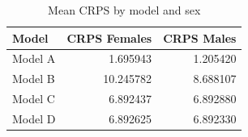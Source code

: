 \begin{table}[ht]
\centering
\begin{tabular}{lrr}
\hline
Model & CRPS Females & CRPS Males \\
\hline
Model A & 1.695943 & 1.205420 \\
Model B & 10.245782 & 8.688107 \\
Model C & 6.892437 & 6.892880 \\
Model D & 6.892625 & 6.892330 \\
\hline
\end{tabular}
\caption{Mean CRPS by model and sex}
\label{tab:mean_crps_by_sex}
\end{table}
